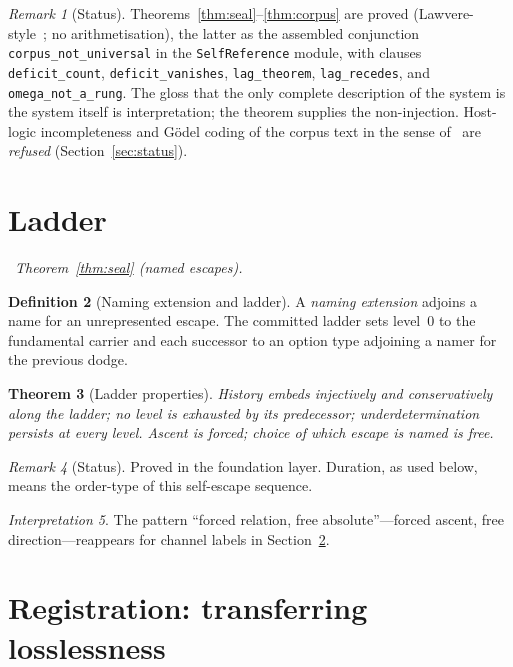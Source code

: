 \documentclass[11pt,a4paper]{article}
\theoremstyle{plain}
\newtheorem{theorem}{Theorem}[section]
\theoremstyle{definition}
\newtheorem{definition}[theorem]{Definition}
\theoremstyle{remark}
\newtheorem{remark}[theorem]{Remark}
\newtheorem{interpretation}[theorem]{Interpretation}
\newcommand{\dep}[1]{%
  \par\noindent{\small\color{muted}\sffamily Dependence:}~\textit{#1}\par\medskip}
\begin{document}
\begin{remark}[Status]
Theorems~\ref{thm:seal}--\ref{thm:corpus} are proved
(Lawvere-style~\cite{lawvere}; no arithmetisation), the latter as the
assembled conjunction \texttt{corpus\_not\_universal} in the
\texttt{SelfReference} module, with clauses \texttt{deficit\_count},
\texttt{deficit\_vanishes}, \texttt{lag\_theorem},
\texttt{lag\_recedes}, and \texttt{omega\_not\_a\_rung}. The gloss that the only
complete description of the system is the system itself is
interpretation; the theorem supplies the non-injection. Host-logic
incompleteness and G\"odel coding of the corpus text in the sense
of~\cite{godel} are \emph{refused} (Section~\ref{sec:status}).
\end{remark}


\section{Ladder}
\label{sec:ladder}

\dep{Theorem~\ref{thm:seal} (named escapes).}

\begin{definition}[Naming extension and ladder]
\label{def:ladder}
A \emph{naming extension} adjoins a name for an unrepresented escape. The
committed ladder sets level~$0$ to the fundamental carrier and each
successor to an option type adjoining a namer for the previous dodge.
\end{definition}

\begin{theorem}[Ladder properties]
\label{thm:ladder}
History embeds injectively and conservatively along the ladder; no level
is exhausted by its predecessor; underdetermination persists at every
level. Ascent is forced; choice of which escape is named is free.
\end{theorem}

\begin{remark}[Status]
Proved in the foundation layer. Duration, as used below, means the
order-type of this self-escape sequence.
\end{remark}

\begin{interpretation}
\label{int:ladder}
The pattern ``forced relation, free absolute''---forced ascent, free
direction---reappears for channel labels in Section~\ref{sec:reg}.
\end{interpretation}


\section{Registration: transferring losslessness}
\label{sec:reg}
\end{document}
